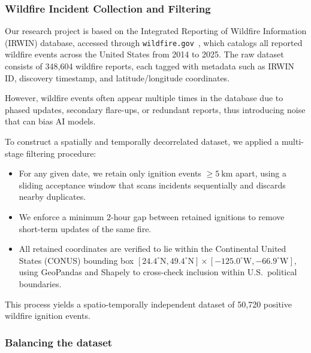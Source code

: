 \documentclass[conference]{IEEEtran}
\begin{document}
\subsubsection{Wildfire Incident Collection and Filtering}

Our research project is based on the Integrated Reporting of Wildfire Information (IRWIN) database, accessed through \texttt{wildfire.gov}~\cite{IRWIN_database}, which catalogs all reported wildfire events across the United States from 2014 to 2025. The raw dataset consists of 348,604 wildfire reports, each tagged with metadata such as IRWIN ID, discovery timestamp, and latitude/longitude coordinates.

However, wildfire events often appear multiple times in the database due to phased updates, secondary flare-ups, or redundant reports, thus introducing noise that can bias AI models.

To construct a spatially and temporally decorrelated dataset, we applied a multi-stage filtering procedure:

\begin{itemize}
    \item For any given date, we retain only ignition events \(\geq 5~\mathrm{km}\) apart, using a sliding acceptance window that scans incidents sequentially and discards nearby duplicates.
    \item We enforce a minimum 2-hour gap between retained ignitions to remove short-term updates of the same fire.
    \item All retained coordinates are verified to lie within the Continental United States (CONUS) bounding box \([24.4^\circ\mathrm{N}, 49.4^\circ\mathrm{N}] \times [-125.0^\circ\mathrm{W}, -66.9^\circ\mathrm{W}]\), using GeoPandas and Shapely to cross-check inclusion within U.S.\ political boundaries.
\end{itemize}

This process yields a spatio-temporally independent dataset of 50,720 positive wildfire ignition events.


\subsubsection{Balancing the dataset}

\end{document}

